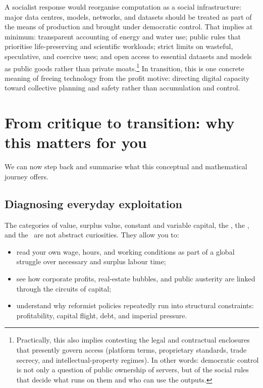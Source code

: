 A socialist response would reorganise computation as a social infrastructure:
major data centres, models, networks, and datasets should be treated as part of
the means of production and brought under democratic control.
That implies at minimum: transparent accounting of energy and water use; public rules that prioritise
life-preserving and scientific workloads; strict limits on wasteful, speculative, and coercive uses;
and open access to essential datasets and models as public goods rather than private moats.\footnote{Practically, this also implies contesting the legal and contractual enclosures that presently govern access (platform terms, proprietary standards, trade secrecy, and intellectual-property regimes). In other words: democratic control is not only a question of public ownership of servers, but of the social rules that decide what runs on them and who can use the outputs.}
In transition, this is one concrete meaning of freeing technology from the profit motive: directing
digital capacity toward collective planning and safety rather than accumulation and control.

\section{From critique to transition: why this matters for you}
\label{sec:transition}

We can now step back and summarise what this conceptual and mathematical
journey offers.

\subsection{Diagnosing everyday exploitation}

The categories of value, surplus value, constant and variable capital,
the \profitratefull, the \organiccompfull, and the \TRPFfull\ are not abstract curiosities. They allow you to:

\begin{itemize}[leftmargin=1.5em]
  \item read your own wage, hours, and working conditions as part of a global
  struggle over necessary and surplus labour time;
  \item see how corporate profits, real-estate bubbles, and public austerity
  are linked through the circuits of capital;
  \item understand why reformist policies repeatedly run into structural
  constraints: profitability, capital flight, debt, and imperial pressure.
\end{itemize}

